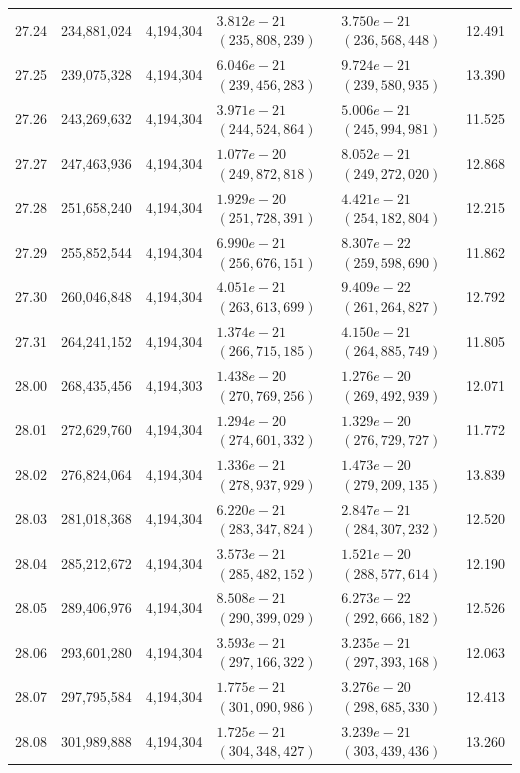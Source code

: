 \documentclass[11pt]{article}
\theoremstyle{definition}
\begin{document}
\begin{longtable}{@{}c r r >{\raggedleft\arraybackslash}p{34mm} >{\raggedleft\arraybackslash}p{34mm} r@{}}
27.24 & 234{,}881{,}024 & 4{,}194{,}304 & $3.812e-21$ $(235{,}808{,}239)$ & $3.750e-21$ $(236{,}568{,}448)$ & 12.491 \\
27.25 & 239{,}075{,}328 & 4{,}194{,}304 & $6.046e-21$ $(239{,}456{,}283)$ & $9.724e-21$ $(239{,}580{,}935)$ & 13.390 \\
27.26 & 243{,}269{,}632 & 4{,}194{,}304 & $3.971e-21$ $(244{,}524{,}864)$ & $5.006e-21$ $(245{,}994{,}981)$ & 11.525 \\
27.27 & 247{,}463{,}936 & 4{,}194{,}304 & $1.077e-20$ $(249{,}872{,}818)$ & $8.052e-21$ $(249{,}272{,}020)$ & 12.868 \\
27.28 & 251{,}658{,}240 & 4{,}194{,}304 & $1.929e-20$ $(251{,}728{,}391)$ & $4.421e-21$ $(254{,}182{,}804)$ & 12.215 \\
27.29 & 255{,}852{,}544 & 4{,}194{,}304 & $6.990e-21$ $(256{,}676{,}151)$ & $8.307e-22$ $(259{,}598{,}690)$ & 11.862 \\
27.30 & 260{,}046{,}848 & 4{,}194{,}304 & $4.051e-21$ $(263{,}613{,}699)$ & $9.409e-22$ $(261{,}264{,}827)$ & 12.792 \\
27.31 & 264{,}241{,}152 & 4{,}194{,}304 & $1.374e-21$ $(266{,}715{,}185)$ & $4.150e-21$ $(264{,}885{,}749)$ & 11.805 \\
28.00 & 268{,}435{,}456 & 4{,}194{,}303 & $1.438e-20$ $(270{,}769{,}256)$ & $1.276e-20$ $(269{,}492{,}939)$ & 12.071 \\
28.01 & 272{,}629{,}760 & 4{,}194{,}304 & $1.294e-20$ $(274{,}601{,}332)$ & $1.329e-20$ $(276{,}729{,}727)$ & 11.772 \\
28.02 & 276{,}824{,}064 & 4{,}194{,}304 & $1.336e-21$ $(278{,}937{,}929)$ & $1.473e-20$ $(279{,}209{,}135)$ & 13.839 \\
28.03 & 281{,}018{,}368 & 4{,}194{,}304 & $6.220e-21$ $(283{,}347{,}824)$ & $2.847e-21$ $(284{,}307{,}232)$ & 12.520 \\
28.04 & 285{,}212{,}672 & 4{,}194{,}304 & $3.573e-21$ $(285{,}482{,}152)$ & $1.521e-20$ $(288{,}577{,}614)$ & 12.190 \\
28.05 & 289{,}406{,}976 & 4{,}194{,}304 & $8.508e-21$ $(290{,}399{,}029)$ & $6.273e-22$ $(292{,}666{,}182)$ & 12.526 \\
28.06 & 293{,}601{,}280 & 4{,}194{,}304 & $3.593e-21$ $(297{,}166{,}322)$ & $3.235e-21$ $(297{,}393{,}168)$ & 12.063 \\
28.07 & 297{,}795{,}584 & 4{,}194{,}304 & $1.775e-21$ $(301{,}090{,}986)$ & $3.276e-20$ $(298{,}685{,}330)$ & 12.413 \\
28.08 & 301{,}989{,}888 & 4{,}194{,}304 & $1.725e-21$ $(304{,}348{,}427)$ & $3.239e-21$ $(303{,}439{,}436)$ & 13.260 \\

\end{longtable}
\end{document}
